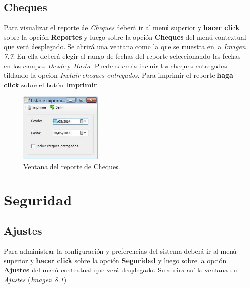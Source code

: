 \documentclass{book}
\begin{document}
\section{Cheques}

Para visualizar el reporte de \textit{Cheques} deberá ir al menú superior y \textbf{hacer click} sobre la opción \textbf{Reportes} y luego sobre la opción \textbf{Cheques} del menú contextual que verá desplegado. Se abrirá una ventana como la que se muestra en la \textit{Imagen 7.7}. En ella deberá elegir el rango de fechas del reporte seleccionando las fechas en los campos \textit{Desde} y \textit{Hasta}. Puede además incluir los cheques entregados tildando la opcion \textit{Incluir cheques entregados}. Para imprimir el reporte \textbf{haga click} sobre el botón \textbf{Imprimir}.
\bigskip

\begin{figure}[H]
	\centering
	\includegraphics[width=0.36\textwidth]{images/ventanas/ventana-18.jpg}
	\caption{Ventana del reporte de Cheques.}
	\medskip
\end{figure}
\bigskip


%
%
\chapter{Seguridad}


\section{Ajustes}

Para administrar la configuración y preferencias del sistema deberá ir al menú superior y \textbf{hacer click} sobre la opción \textbf{Seguridad} y luego sobre la opción \textbf{Ajustes} del menú contextual que verá desplegado. Se abrirá así la ventana de \textit{Ajustes} (\textit{Imagen 8.1}).
\medskip
\end{document}
